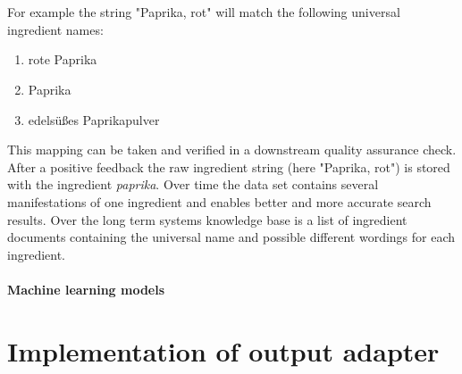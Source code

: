\\\\
For example the string "Paprika, rot" will match the following universal ingredient names:
\begin{enumerate}
\item rote Paprika
\item Paprika
\item edelsüßes Paprikapulver
\end{enumerate}
This mapping can be taken and verified in a downstream quality assurance check. After a positive feedback the raw ingredient string (here "Paprika, rot") is stored with the ingredient \textit{paprika}. Over time the data set contains several manifestations of one ingredient and enables better and more accurate search results. Over the long term systems knowledge base is a list of ingredient documents containing the universal name and possible different wordings for each ingredient. 
\\\\
\textbf{Machine learning models}


\section{Implementation of output adapter}














